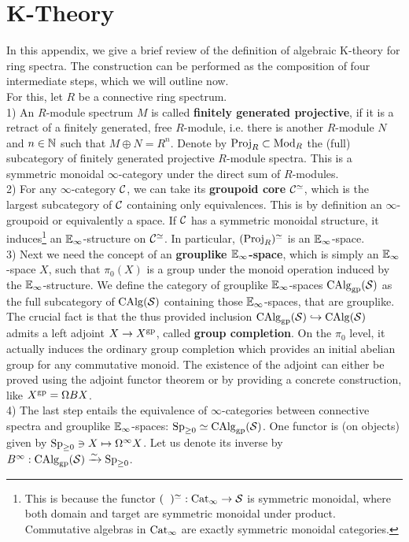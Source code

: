 \appendix
\chapter{K-Theory}
In this appendix, we give a brief review of the definition of algebraic K-theory for ring spectra. The construction can be performed as the composition of four intermediate steps, which we will outline now. \\
For this, let $R$ be a connective ring spectrum. \\
1) An $R$-module spectrum $M$ is called \textbf{finitely generated projective}, if it is a retract of a finitely generated, free $R$-module, i.e. there is another $R$-module $N$ and  $n\in\mathbb{N}$ such that $M\oplus N=R^n$.
Denote by $\operatorname{Proj}_R\subset \operatorname{Mod}_R$ the (full) subcategory of finitely generated projective $R$-module spectra. This is a symmetric monoidal $\infty$-category under the direct sum of $R$-modules. \\
2) For any $\infty$-category $\mathcal{C}$, we can take its \textbf{groupoid core} $\mathcal{C}^{\simeq}$, which is the largest subcategory of $\mathcal{C}$ containing only equivalences. 
This is by definition an $\infty$-groupoid or equivalently a space. 
If $\mathcal{C}$ has a symmetric monoidal structure, it induces\footnote{This is because the functor $(\phantom{\cC})^{\simeq}:\Cat_{\infty}\ra \Spc$ is symmetric monoidal, where both domain and target are symmetric monoidal under product. 
Commutative algebras in $\operatorname{Cat}_\infty$ are exactly symmetric monoidal categories.} an $\mathbb{E}_\infty$-structure on $\mathcal{C}^{\simeq}$. 
In particular, $(\operatorname{Proj}_R)^{\simeq}$ is an $\mathbb{E}_\infty$-space.\\
3) Next we need the concept of an \textbf{grouplike $\mathbb{E}_\infty$-space}, which is simply an $\mathbb{E}_\infty$-space $X$, such that $\pi_0(X)$ is a group under the monoid operation induced by the $\mathbb{E}_\infty$-structure.
We define the category of grouplike $\mathbb{E}_\infty$-spaces $\operatorname{CAlg}_{\operatorname{gp}}(\mathcal{S})$ as the full subcategory of $\operatorname{CAlg}(\mathcal{S})$ containing those  $\mathbb{E}_\infty$-spaces, that are grouplike.
The crucial fact is that the thus provided inclusion $\operatorname{CAlg}_{\operatorname{gp}}(\mathcal{S})\hookrightarrow \operatorname{CAlg}(\mathcal{S})$ admits a left adjoint $X\to X^{\operatorname{gp}}$, called \textbf{group completion}. On the $\pi_0$ level, it actually induces the ordinary group completion which provides an initial abelian group for any commutative monoid. The existence of the adjoint can either be proved using the adjoint functor theorem or by providing a concrete construction, like $X^{\operatorname{gp}}=\Omega BX$. \\
4) The last step entails the equivalence of $\infty$-categories between connective spectra and grouplike $\mathbb{E}_\infty$-spaces: $\operatorname{Sp}_{\geq 0}\simeq \operatorname{CAlg}_{\operatorname{gp}}(\mathcal{S})$. One functor is (on objects) given by $\operatorname{Sp}_{\geq 0}\ni X\mapsto \Omega^{\infty}X$. Let us denote its inverse by $B^\infty:\operatorname{CAlg}_{\operatorname{gp}}(\mathcal{S})\xrightarrow{\sim} \operatorname{Sp}_{\geq 0} $.  \\
